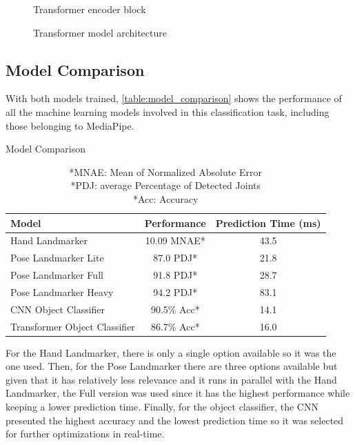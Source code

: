 \begin{figure}[H] %
    \centering
    {\fontsize{10}{12}\selectfont}
    \caption{Transformer encoder block}
    \label{fig:transformer_encoder_architecture}
\end{figure}

\begin{figure}[H] %
    \centering
    {\fontsize{10}{12}\selectfont}
    \caption{Transformer model architecture}
    \label{fig:transformer_architecture}
\end{figure}

\subsection{Model Comparison}

With both models trained, \autoref{table:model_comparison} shows the performance of all the machine learning models involved in this classification task, including those belonging to MediaPipe.

\begin{table}[H] %
    \centering
    \caption{Model Comparison}
    \label{table:model_comparison}
    \begin{tabular}{lcc}
        \toprule
        Model & Performance & Prediction Time (ms) \\
        \midrule
        Hand Landmarker & 10.09 MNAE* & 43.5 \\
        Pose Landmarker Lite & 87.0 PDJ* & 21.8 \\
        Pose Landmarker Full & 91.8 PDJ* & 28.7 \\
        Pose Landmarker Heavy & 94.2 PDJ* & 83.1 \\
        CNN Object Classifier & 90.5\% Acc* & 14.1 \\
        Transformer Object Classifier & 86.7\% Acc* & 16.0 \\
        \bottomrule
    \end{tabular}
    \captionsetup{width=0.9\textwidth}
    \caption*{*MNAE: Mean of Normalized Absolute Error\\ *PDJ: average Percentage of Detected Joints\\ *Acc: Accuracy}
\end{table}

For the Hand Landmarker, there is only a single option available so it was the one used. Then, for the Pose Landmarker there are three options available but given that it has relatively less relevance and it runs in parallel with the Hand Landmarker, the Full version was used since it has the highest performance while keeping a lower prediction time. Finally, for the object classifier, the CNN presented the highest accuracy and the lowest prediction time so it was selected for further optimizations in real-time.

